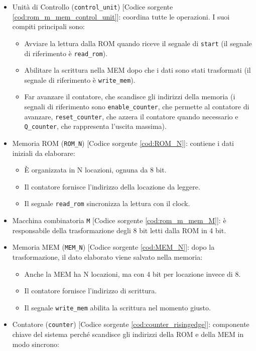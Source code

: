 \begin{itemize}
    \item Unità di Controllo (\texttt{control\_unit}) [Codice sorgente \ref{cod:rom_m_mem_control_unit}]: coordina tutte le operazioni. I suoi compiti principali sono:
    \begin{itemize}
        \item Avviare la lettura dalla ROM quando riceve il segnale di \texttt{start} (il segnale di riferimento è \texttt{read\_rom}).
        \item Abilitare la scrittura nella MEM dopo che i dati sono stati trasformati (il segnale di riferimento è \texttt{write\_mem}).
        \item Far avanzare il contatore, che scandisce gli indirizzi della memoria (i segnali di riferimento sono \texttt{enable\_counter}, che permette al contatore di avanzare, \texttt{reset\_counter}, che azzera il contatore quando necessario e \texttt{Q\_counter}, che rappresenta l'uscita massima).
    \end{itemize}
    \item Memoria ROM (\texttt{ROM\_N}) [Codice sorgente \ref{cod:ROM_N}]: contiene i dati iniziali da elaborare:
    \begin{itemize}
        \item È organizzata in N locazioni, ognuna da 8 bit.
        \item Il contatore fornisce l'indirizzo della locazione da leggere.
        \item Il segnale \texttt{read\_rom} sincronizza la lettura con il clock.
    \end{itemize}
    \item Macchina combinatoria \texttt{M} [Codice sorgente \ref{cod:rom_m_mem_M}]: è responsabile della trasformazione degli 8 bit letti dalla ROM in 4 bit.
    \item Memoria MEM (\texttt{MEM\_N}) [Codice sorgente \ref{cod:MEM_N}]: dopo la trasformazione, il dato elaborato viene salvato nella memoria:
    \begin{itemize}
        \item Anche la MEM ha N locazioni, ma con 4 bit per locazione invece di 8.
        \item Il contatore fornisce l'indirizzo di scrittura.
        \item Il segnale \texttt{write\_mem} abilita la scrittura nel momento giusto.
    \end{itemize}
    \item Contatore (\texttt{counter}) [Codice sorgente \ref{cod:counter_risingedge}]: componente chiave del sistema perché scandisce gli indirizzi della ROM e della MEM in modo sincrono:

\end{itemize}
